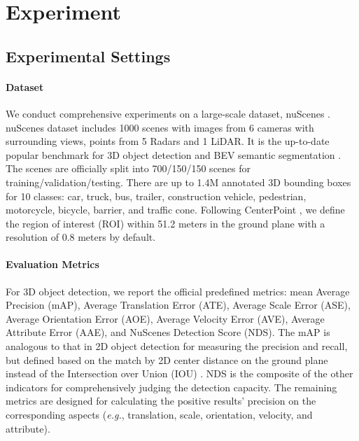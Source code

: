 \documentclass[10pt,twocolumn,letterpaper]{article}
\begin{document}
\section{Experiment}
\subsection{Experimental Settings}
\paragraph{Dataset} We conduct comprehensive experiments on a large-scale dataset, nuScenes \cite{NS}. nuScenes dataset includes 1000 scenes with images from 6 cameras with surrounding views, points from 5 Radars and 1 LiDAR. It is the up-to-date popular benchmark for 3D object detection \cite{FCOS3D,DETR3D,PGD,DD3D} and BEV semantic segmentation \cite{PON,LSS,VPN,PYVA}. The scenes are officially split into 700/150/150 scenes for training/validation/testing. There are up to 1.4M annotated 3D bounding boxes for 10 classes: car, truck, bus, trailer, construction vehicle, pedestrian, motorcycle, bicycle, barrier, and traffic cone. Following CenterPoint \cite{CenterPoint3D}, we define the region of interest (ROI) within 51.2 meters in the ground plane with a resolution of 0.8 meters by default.

\paragraph{Evaluation Metrics} For 3D object detection, we report the official predefined metrics: mean Average Precision (mAP), Average Translation Error (ATE), Average Scale Error (ASE), Average Orientation Error (AOE), Average Velocity Error (AVE), Average Attribute Error (AAE), and NuScenes Detection Score (NDS). The mAP is analogous to that in 2D object detection \cite{COCO} for measuring the precision and recall, but defined based on the match by 2D center distance on the ground plane instead of the Intersection over Union (IOU) \cite{NS}. NDS is the composite of the other indicators for comprehensively judging the detection capacity. The remaining metrics are designed for calculating the positive results' precision on the corresponding aspects (\emph{e.g.}, translation, scale, orientation, velocity, and attribute).
\end{document}
